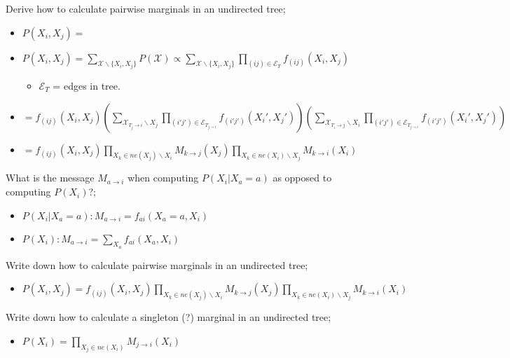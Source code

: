 \documentclass{article}
\begin{document}
Derive how to calculate pairwise marginals in an undirected tree; \begin{itemize}
    \item $P(X_i, X_j) = $ 
    \item $P(X_i, X_j) = \sum_{\mathcal{X}\backslash\{X_i, X_j\}} P(\mathcal{X}) \propto \sum_{\mathcal{X}\backslash\{X_i, X_j\}}\prod_{(ij)\in \mathcal{E}_T} f_{(ij)}(X_i, X_j)$
    \begin{itemize}
        \item $\mathcal{E}_T$ = edges in tree.
    \end{itemize}
    \item $= f_{(ij)}(X_i, X_j)
    (\sum_{\mathcal{X}_{T_j\rightarrow i}\backslash X_j} \prod_{(i'j')\in \mathcal{E}_T_{j\rightarrow i}} f_{(i'j')}(X_i', X_j'))
    (\sum_{\mathcal{X}_{T_i\rightarrow j}\backslash X_i} \prod_{(i'j')\in \mathcal{E}_T_{j\rightarrow i}} f_{(i'j')}(X_i', X_j'))$
    \item $= f_{(ij)}(X_i, X_j) 
    \prod_{X_k\in ne(X_j)\backslash X_i}M_{k\rightarrow j}(X_j)
    \prod_{X_k\in ne(X_i)\backslash X_j}M_{k\rightarrow i}(X_i)$
\end{itemize}

What is the message $M_{a\rightarrow i }$ when computing $P(X_i|X_a = a)$ as opposed to computing $P(X_i)$?; \begin{itemize}
    \item $P(X_i|X_a=a): M_{a\rightarrow i} = f_{ai}(X_a = a, X_i)$
    \item $P(X_i): M_{a\rightarrow i} = \sum_{X_a}f_{ai}(X_a, X_i)$
\end{itemize}

Write down how to calculate pairwise marginals in an undirected tree; \begin{itemize}
    \item $P(X_i, X_j) = f_{(ij)}(X_i, X_j)\prod_{X_k\in ne(X_j)\backslash X_i}M_{k\rightarrow j}(X_j)\prod_{X_k\in ne(X_i)\backslash X_j}M_{k\rightarrow i}(X_i)$
\end{itemize}

Write down how to calculate a singleton (?) marginal in an undirected tree; \begin{itemize}
    \item $P(X_i) = \prod_{X_j\in ne(X_i)}M_{j\rightarrow i}(X_i)$
\end{itemize}
\end{document}
